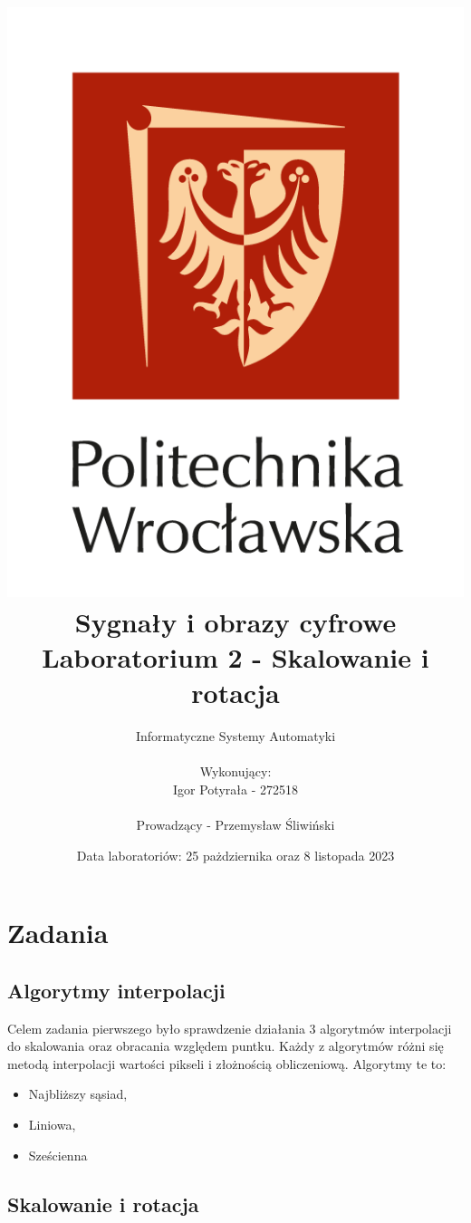 \documentclass[14pt]{article}
\title{
    \includegraphics[scale=0.5]{images/logo-pwr-pion.png}
    \vspace{1cm}
    \\
    {\textbf{
    \titlefont Sygnały i obrazy cyfrowe
    \\ Laboratorium 2 - Skalowanie i rotacja
    }}
}
\author{
    Informatyczne Systemy Automatyki
    \\
    \\ Wykonujący:
    \\ Igor Potyrała - 272518
    \\
    \\ Prowadzący - Przemysław Śliwiński
}
\date{Data laboratoriów: 25 pażdziernika oraz 8 listopada 2023}
\begin{document}
\maketitle
\newpage

\section{Zadania}
\subsection{Algorytmy interpolacji}
Celem zadania pierwszego było sprawdzenie działania 3 algorytmów interpolacji
do skalowania oraz obracania względem puntku. Każdy z algorytmów 
różni się metodą interpolacji wartości pikseli i złożnością obliczeniową.
Algorytmy te to:
\begin{itemize}
    \item Najbliższy sąsiad,
    \item Liniowa,
    \item Sześcienna
\end{itemize}



\newpage
\subsection{Skalowanie i rotacja}
\end{document}
